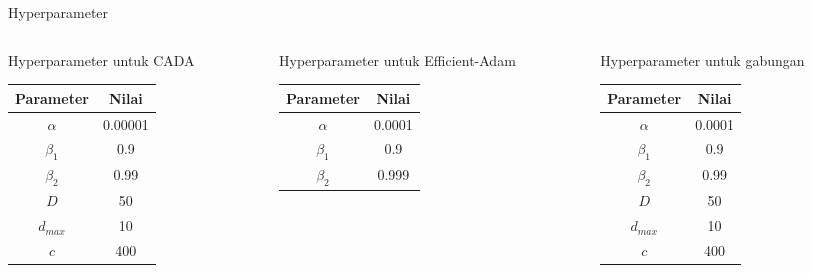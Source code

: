 \begin{frame}{Hyperparameter}
  \begin{columns}[b]
    \begin{column}{3.5cm}
      Hyperparameter untuk CADA \\
      \vspace{1cm}
      \begin{tabular}{ | c | c | }
        \hline
        \textbf{Parameter} & \textbf{Nilai} \\
        \hline
        $\alpha$           & 0.00001        \\
        \hline
        $\beta_1$          & 0.9            \\
        \hline
        $\beta_2$          & 0.99           \\
        \hline
        $D$                & 50             \\
        \hline
        $d_{max}$          & 10             \\
        \hline
        $c$                & 400            \\
        \hline
      \end{tabular}
    \end{column}
    \begin{column}{3.5cm}
      Hyperparameter untuk Efficient-Adam \\
      \vspace{1cm}
      \begin{tabular}{ | c | c | }
        \hline
        \textbf{Parameter} & \textbf{Nilai} \\
        \hline
        $\alpha$           & 0.0001         \\
        \hline
        $\beta_1$          & 0.9            \\
        \hline
        $\beta_2$          & 0.999          \\
        \hline
      \end{tabular}
    \end{column}
    \begin{column}{3.5cm}
      Hyperparameter untuk gabungan \\
      \vspace{1cm}
      \begin{tabular}{ | c | c | }
        \hline
        \textbf{Parameter} & \textbf{Nilai} \\
        \hline
        $\alpha$           & 0.0001         \\
        \hline
        $\beta_1$          & 0.9            \\
        \hline
        $\beta_2$          & 0.99           \\
        \hline
        $D$                & 50             \\
        \hline
        $d_{max}$          & 10             \\
        \hline
        $c$                & 400            \\
        \hline
      \end{tabular}
    \end{column}
  \end{columns}
\end{frame}

